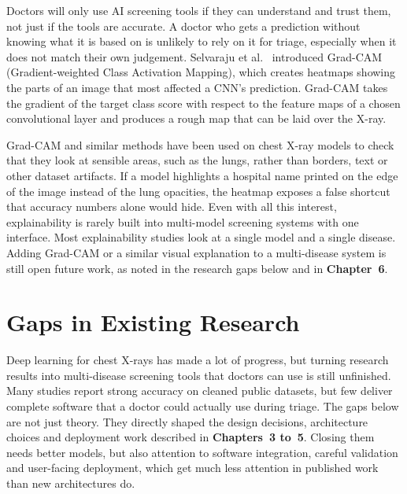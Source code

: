 Doctors will only use AI screening tools if they can understand and trust them, not just if the tools are accurate. A doctor who gets a prediction without knowing what it is based on is unlikely to rely on it for triage, especially when it does not match their own judgement. Selvaraju et al.~\cite{selvaraju2017} introduced Grad-CAM (Gradient-weighted Class Activation Mapping), which creates heatmaps showing the parts of an image that most affected a CNN's prediction. Grad-CAM takes the gradient of the target class score with respect to the feature maps of a chosen convolutional layer and produces a rough map that can be laid over the X-ray.

Grad-CAM and similar methods have been used on chest X-ray models to check that they look at sensible areas, such as the lungs, rather than borders, text or other dataset artifacts. If a model highlights a hospital name printed on the edge of the image instead of the lung opacities, the heatmap exposes a false shortcut that accuracy numbers alone would hide. Even with all this interest, explainability is rarely built into multi-model screening systems with one interface. Most explainability studies look at a single model and a single disease. Adding Grad-CAM or a similar visual explanation to a multi-disease system is still open future work, as noted in the research gaps below and in \textbf{Chapter~6}.

\section{Gaps in Existing Research}
\label{sec:lit-gaps}

Deep learning for chest X-rays has made a lot of progress, but turning research results into multi-disease screening tools that doctors can use is still unfinished. Many studies report strong accuracy on cleaned public datasets, but few deliver complete software that a doctor could actually use during triage. The gaps below are not just theory. They directly shaped the design decisions, architecture choices and deployment work described in \textbf{Chapters~3 to~5}. Closing them needs better models, but also attention to software integration, careful validation and user-facing deployment, which get much less attention in published work than new architectures do.

